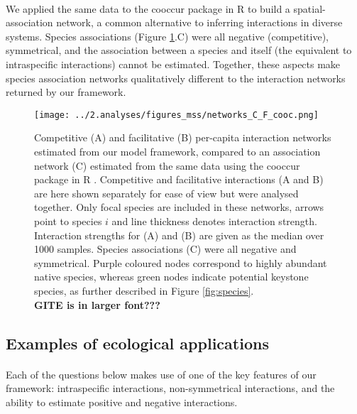 \documentclass[a4,12pt]{article}
\begin{document}
     \paragraph{}
     We applied the same data to the cooccur package in R \parencite{Griffith2016} to build a spatial-association network, a common alternative to inferring interactions in diverse systems. Species associations (Figure \ref{fig:netwks}.C) were all negative (competitive), symmetrical, and the association between a species and itself (the equivalent to intraspecific interactions) cannot be estimated. Together, these aspects make species association networks qualitatively different to the interaction networks returned by our framework. 


       \begin{figure}[H]
        \begin{centering}
        \texttt{[image: ../2.analyses/figures\_mss/networks\_C\_F\_cooc.png]}
        \caption{Competitive (A) and facilitative (B) per-capita interaction networks estimated from our model framework, compared to an association network (C) estimated from the same data using the cooccur package in R \parencite{Griffith2016}. Competitive and facilitative interactions (A and B) are here shown separately for ease of view but were analysed together. Only focal species are included in these networks, arrows point to species $i$ and line thickness denotes interaction strength. Interaction strengths for (A) and (B) are given as the median over 1000 samples. Species associations (C) were all negative and symmetrical. Purple coloured nodes correspond to highly abundant native species, whereas green nodes indicate potential keystone species, as further described in Figure \ref{fig:species}. \\
        \textbf{GITE is in larger font???}}
        \label{fig:netwks}
       \end{centering}
    \end{figure}    



    \subsection{Examples of ecological applications}

    \paragraph{}
    Each of the questions below makes use of one of the key features of our framework: intraspecific interactions, non-symmetrical interactions, and the ability to estimate positive and negative interactions. 
\end{document}
